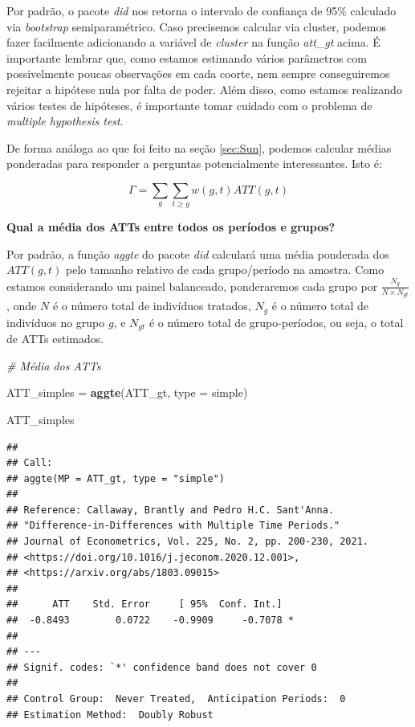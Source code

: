 \documentclass[portugues]{article}
\newenvironment{Shaded}{\begin{snugshade}}{\end{snugshade}}
\newcommand{\AttributeTok}[1]{\textcolor[rgb]{0.13,0.29,0.53}{#1}}
\newcommand{\CommentTok}[1]{\textcolor[rgb]{0.56,0.35,0.01}{\textit{#1}}}
\newcommand{\FunctionTok}[1]{\textcolor[rgb]{0.13,0.29,0.53}{\textbf{#1}}}
\newcommand{\NormalTok}[1]{#1}
\newcommand{\OtherTok}[1]{\textcolor[rgb]{0.56,0.35,0.01}{#1}}
\newcommand{\StringTok}[1]{\textcolor[rgb]{0.31,0.60,0.02}{#1}}
\begin{document}
Por padrão, o pacote \textit{did} nos retorna o intervalo de confiança de 95\% calculado via \textit{bootstrap} semiparamétrico. Caso precisemos calcular via cluster, podemos fazer facilmente adicionando a variável de \textit{cluster} na função \textit{att\_gt} acima. É importante lembrar que, como estamos estimando vários parâmetros com possivelmente poucas observações em cada coorte, nem sempre conseguiremos rejeitar a hipótese nula por falta de poder. Além disso, como estamos realizando vários testes de hipóteses, é importante tomar cuidado com o problema de \textit{multiple hypothesis test}.

De forma análoga ao que foi feito na seção \ref{sec:Sun}, podemos calcular médias ponderadas para responder a perguntas potencialmente interessantes. Isto é:

\[ \Gamma = \sum_g \sum_{t \geq g} w(g,t) ATT(g,t) \]


\vspace{3mm}

\textbf{Qual a média dos ATTs entre todos os períodos e grupos?}

\vspace{3mm}

Por padrão, a função \textit{aggte} do pacote \textit{did} calculará uma média ponderada dos $ATT(g,t)$ pelo tamanho relativo de cada grupo/período na amostra. Como estamos considerando um painel balanceado, ponderaremos cada grupo por $\frac{N_g}{N \times N_{gt}}$, onde $N$ é o número total de indivíduos tratados, $N_g$ é o número total de indivíduos no grupo $g$, e $N_{gt}$ é o número total de grupo-períodos, ou seja, o total de ATTs estimados.
  

\begin{box_code}

\begin{Shaded}
\begin{Highlighting}[]
\CommentTok{\# Média dos ATTs}

\NormalTok{ATT\_simples }\OtherTok{=} \FunctionTok{aggte}\NormalTok{(ATT\_gt, }\AttributeTok{type =} \StringTok{\textquotesingle{}simple\textquotesingle{}}\NormalTok{)}

\NormalTok{ATT\_simples}
\end{Highlighting}
\end{Shaded}

\begin{verbatim}
## 
## Call:
## aggte(MP = ATT_gt, type = "simple")
## 
## Reference: Callaway, Brantly and Pedro H.C. Sant'Anna.  
## "Difference-in-Differences with Multiple Time Periods." 
## Journal of Econometrics, Vol. 225, No. 2, pp. 200-230, 2021. 
## <https://doi.org/10.1016/j.jeconom.2020.12.001>, 
## <https://arxiv.org/abs/1803.09015> 
## 
##      ATT    Std. Error     [ 95%  Conf. Int.]  
##  -0.8493        0.0722    -0.9909     -0.7078 *
## 
## ---
## Signif. codes: `*' confidence band does not cover 0
## 
## Control Group:  Never Treated,  Anticipation Periods:  0
## Estimation Method:  Doubly Robust
\end{verbatim}

\end{box_code}
\end{document}
